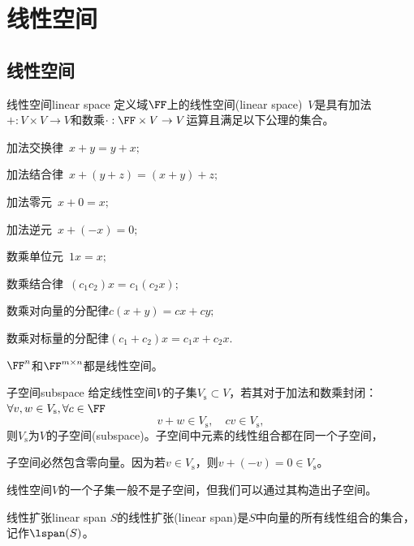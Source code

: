 \chapter{线性空间}
\section{线性空间}
\begin{definition}{线性空间}{linear space}
	定义域$\FF$上的线性空间(linear space)~$V$是具有加法$+:V\times V\to V$和数乘$\cdot:\FF\times V\to V$运算且满足以下公理的集合。
	\begin{compactenum}
		\item 加法交换律\qqqquad\quad~$x+y=y+x;$
		\item 加法结合律\qqqquad\quad~$x+(y+z)=(x+y)+z;$
		\item 加法零元\qqqquad\qquad~$x+0=x;$
		\item 加法逆元\qqqquad\qquad~$x+(-x)=0;$
		\item 数乘单位元\qqqquad\quad~$1x=x;$
		\item 数乘结合律\qqqquad\quad~$(c_1c_2)x=c_1(c_2x);$
		\item 数乘对向量的分配律\quad$c(x+y)=cx+cy;$
		\item 数乘对标量的分配律\quad$(c_1+c_2)x=c_1x+c_2x.$
	\end{compactenum}
\end{definition}

\begin{example}
	{}{}
	$\FF^n$和$\FF^{m\times n}$都是线性空间。
\end{example}

\begin{definition}{子空间}{subspace}
	给定线性空间$V$的子集$V_\mathrm s\subset V$，若其对于加法和数乘封闭：$\forall v,w\in V_\mathrm s,\forall c\in\FF$
	\[
		v+w\in V_\mathrm s,\quad cv\in V_\mathrm s,
	\]
	则$V_\mathrm s$为$V$的子空间(subspace)。子空间中元素的线性组合都在同一个子空间，
\end{definition}

\begin{corollary}
	子空间必然包含零向量。因为若$v\in V_\mathrm s$，则$v+(-v)=0\in V_\mathrm s$。
\end{corollary}

\begin{remark}
	线性空间$V$的一个子集一般不是子空间，但我们可以通过其构造出子空间。
\end{remark}

\begin{definition}{线性扩张}{linear span}
	$S$的线性扩张(linear span)是$S$中向量的所有线性组合的集合，记作$\lspan(S)$。
\end{definition}


